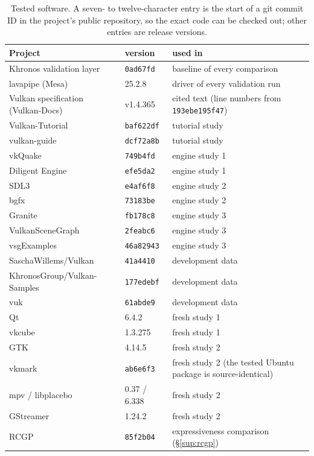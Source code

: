 \documentclass[acmtog,anonymous,review]{acmart}
\newcommand{\rcgp}{RCGP\xspace}
\newcommand{\code}[1]{\texttt{#1}}
\begin{document}
\begin{table}[htbp]
\caption{Tested software. A seven- to twelve-character entry is the start of a git commit ID in the project's public
repository, so the exact code can be checked out; other entries are release versions.}
\label{tab:s-software}
\scriptsize
\begin{tabular}{@{}p{}p{}p{}@{}}
\toprule
Project & version & used in \\
\midrule
Khronos validation layer & \code{0ad67fd} & baseline of every comparison \\
lavapipe (Mesa) & 25.2.8 & driver of every validation run \\
Vulkan specification (Vulkan-Docs) & v1.4.365 & cited text (line numbers from \code{193ebe195f47}) \\
Vulkan-Tutorial & \code{baf622df} & tutorial study \\
vulkan-guide & \code{dcf72a8b} & tutorial study \\
vkQuake & \code{749b4fd} & engine study 1 \\
Diligent Engine & \code{efe5da2} & engine study 1 \\
SDL3 & \code{e4af6f8} & engine study 2 \\
bgfx & \code{73183be} & engine study 2 \\
Granite & \code{fb178c8} & engine study 3 \\
VulkanSceneGraph & \code{2feabc6} & engine study 3 \\
vsgExamples & \code{46a82943} & engine study 3 \\
SaschaWillems/Vulkan & \code{41a4410} & development data \\
KhronosGroup/Vulkan-Samples & \code{177edebf} & development data \\
vuk & \code{61abde9} & development data \\
Qt & 6.4.2 & fresh study 1 \\
vkcube & 1.3.275 & fresh study 1 \\
GTK & 4.14.5 & fresh study 2 \\
vkmark & \code{ab6e6f3} & fresh study 2 (the tested Ubuntu package is source-identical) \\
mpv / libplacebo & 0.37 / 6.338 & fresh study 2 \\
GStreamer & 1.24.2 & fresh study 2 \\
\rcgp & \code{85f2b04} & expressiveness comparison (\S\ref{sup:rcgp}) \\
\bottomrule
\end{tabular}
\end{table}
\end{document}
